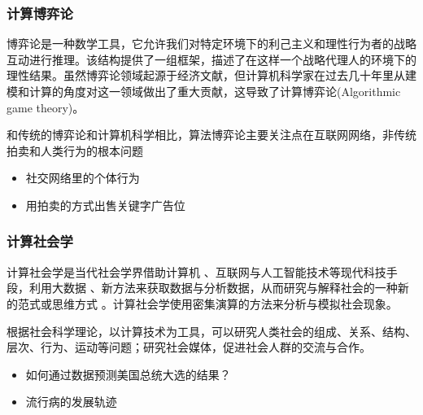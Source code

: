 \begin{frame}
    \frametitle{计算博弈论}

    博弈论是一种数学工具，它允许我们对特定环境下的利己主义和理性行为者的战略互动进行推理。该结构提供了一组框架，描述了在这样一个战略代理人的环境下的理性结果。虽然博弈论领域起源于经济文献，但计算机科学家在过去几十年里从建模和计算的角度对这一领域做出了重大贡献，这导致了计算博弈论(Algorithmic game theory)。

    和传统的博弈论和计算机科学相比，算法博弈论主要关注点在互联网网络，非传统拍卖和人类行为的根本问题

    \begin{itemize}
      \item 社交网络里的个体行为
      \item 用拍卖的方式出售关键字广告位
    \end{itemize}
\end{frame}


\begin{frame}
    \frametitle{计算社会学}
    

    计算社会学是当代社会学界借助计算机 、互联网与人工智能技术等现代科技手段，利用大数据 、新方法来获取数据与分析数据，从而研究与解释社会的一种新的范式或思维方式 。计算社会学使用密集演算的方法来分析与模拟社会现象。

根据社会科学理论，以计算技术为工具，可以研究人类社会的组成、关系、结构、层次、行为、运动等问题；研究社会媒体，促进社会人群的交流与合作。

\begin{itemize}
  \item 如何通过数据预测美国总统大选的结果？
  \item 流行病的发展轨迹
\end{itemize}

\end{frame}








